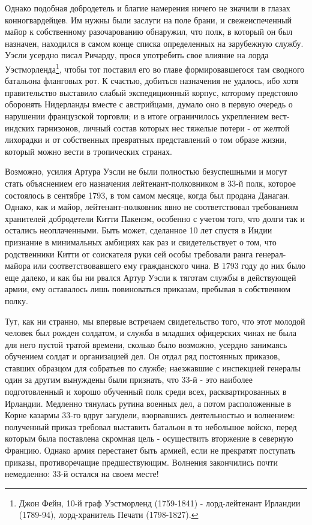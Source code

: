 \documentclass[
  oneside,
  12pt,
  titlepage]{book}
\begin{document}
Однако подобная добродетель и благие намерения ничего не значили в глазах конногвардейцев. Им нужны были заслуги на поле брани, и свежеиспеченный майор к собственному разочарованию обнаружил, что полк, в который он был назначен, находился в самом конце списка определенных на зарубежную службу. Уэсли усердно писал Ричарду, прося употребить свое влияние на лорда Уэстморленда\footnote{Джон Фейн, 10-й граф Уэстморленд (1759-1841) - лорд-лейтенант Ирландии (1789-94), лорд-хранитель Печати (1798-1827).}, чтобы тот поставил его во главе формировавшегося там сводного батальона фланговых рот. К счастью, добиться назначения не удалось, ибо хотя правительство выставило слабый экспедиционный корпус, которому предстояло оборонять Нидерланды вместе с австрийцами, думало оно в первую очередь о нарушении французской торговли; и в итоге ограничилось укреплением вест-индских гарнизонов, личный состав которых нес тяжелые потери - от желтой лихорадки и от собственных превратных представлений о том образе жизни, который можно вести в тропических странах.

Возможно, усилия Артура Уэсли не были полностью безуспешными и могут стать объяснением его назначения лейтенант-полковником в 33-й полк, которое состоялось в сентябре 1793, в том самом месяце, когда был продана Данаган. Однако, как и майор, лейтенант-полковник явно не соответствовал требованиям хранителей добродетели Китти Пакенэм, особенно с учетом того, что долги так и остались неоплаченными. Быть может, сделанное 10 лет спустя в Индии признание в минимальных амбициях как раз и свидетельствует о том, что родственники Китти от соискателя руки сей особы требовали ранга генерал-майора или соответствовавшего ему гражданского чина. В 1793 году до них было еще далеко, и как бы ни рвался Артур Уэсли к тяготам службы в действующей армии, ему оставалось лишь повиноваться приказам, пребывая в собственном полку.

Тут, как ни странно, мы впервые встречаем свидетельство того, что этот молодой человек был рожден солдатом, и служба в младших офицерских чинах не была для него пустой тратой времени, сколько было возможно, усердно занимаясь обучением солдат и организацией дел. Он отдал ряд постоянных приказов, ставших образцом для собратьев по службе; наезжавшие с инспекцией генералы один за другим вынуждены были признать, что 33-й - это наиболее подготовленный и хорошо обученный полк среди всех, расквартированных в Ирландии. Медленно тянулась рутина военных дел, а потом расположенные в Корне казармы 33-го вдруг загудели, взорвавшись деятельностью и волнением: полученный приказ требовал выставить батальон в то небольшое войско, перед которым была поставлена скромная цель - осуществить вторжение в северную Францию. Однако армия перестанет быть армией, если не прекратят поступать приказы, противоречащие предшествующим. Волнения закончились почти немедленно: 33-й остался на своем месте!
\end{document}
